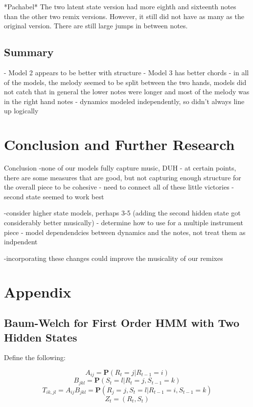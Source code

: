 \documentclass{article} %
\begin{document}
*Pachabel*
The two latent state version had more eighth and sixteenth notes than the other two remix versions. However, it still did not have as many as the original version. There are still large jumps in between notes. 


\subsection{Summary}
- Model 2 appears to be better with structure
- Model 3 has better chords
- in all of the models, the melody seemed to be split between the two hands, models did not catch that in general the lower notes were longer and most of the melody was in the right hand notes
- dynamics modeled independently, so didn't always line up logically

\section{Conclusion and Further Research}

Conclusion 
-none of our models fully capture music, DUH
- at certain points, there are some measures that are good, but not capturing enough structure for the overall piece to be cohesive
- need to connect all of these little victories
-second state seemed to work best 

-consider higher state models, perhaps 3-5 (adding the second hidden state got considerably better musically)
- determine how to use for a multiple instrument piece
- model dependendcies between dynamics and the notes, not treat them as indpendent

-incorporating these changes could improve the musicality of our remixes


\newpage

\section{Appendix}

\subsection{Baum-Welch for First Order HMM with Two Hidden States}

Define the following:

$$A_{ij} = \textbf{P} (R_t = j | R_{t-1} = i)$$
$$B_{jkl} = \textbf{P} (S_t = l | R_t = j, S_{t-1} = k)$$ 
$$T_{ik, jl} = A_{ij} B_{jkl} = \textbf{P} (R_j = j, S_t = l | R_{t-1} = i, S_{t-1} = k)$$
$$Z_t = (R_t, S_t)$$
\end{document}
